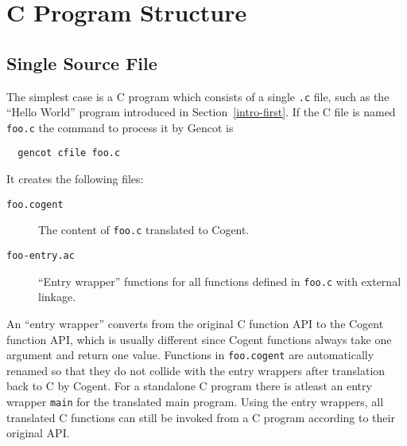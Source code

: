 \documentclass[a4paper]{report}
\newcommand{\code}[1]{\textnormal{\texttt{#1}}}
\begin{document}
\chapter{C Program Structure}
\label{struct}

\section{Single Source File}
\label{struct-single}

The simplest case is a C program which consists of a single \code{.c} file, such as the ``Hello World'' program
introduced in Section~\ref{intro-first}. If the C file is named \code{foo.c} the command to process it by Gencot is
\begin{verbatim}
  gencot cfile foo.c
\end{verbatim}
It creates the following files:
\begin{description}
\item[\code{foo.cogent}] The content of \code{foo.c} translated to Cogent.
\item[\code{foo-entry.ac}] ``Entry wrapper'' functions for all functions defined in \code{foo.c} 
with external linkage.
\end{description}

An ``entry wrapper'' converts from the original C function API to the Cogent function API, which is usually different 
since Cogent functions always take one argument and return one value. Functions in \code{foo.cogent} are automatically
renamed so that they do not collide with the entry wrappers after translation back to C by Cogent. For a standalone
C program there is atleast an entry wrapper \code{main} for the translated main program. Using the entry wrappers, all
translated C functions can still be invoked from a C program according to their original API.
\end{document}
